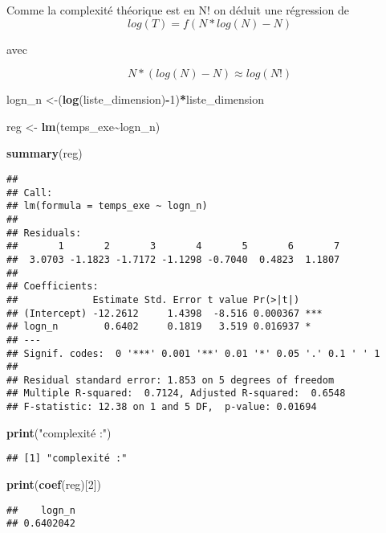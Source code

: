 \documentclass[
  ignorenonframetext,
]{beamer}
\newenvironment{Shaded}{\begin{snugshade}}{\end{snugshade}}
\newcommand{\DecValTok}[1]{\textcolor[rgb]{0.00,0.00,0.81}{#1}}
\newcommand{\FunctionTok}[1]{\textcolor[rgb]{0.13,0.29,0.53}{\textbf{#1}}}
\newcommand{\NormalTok}[1]{#1}
\newcommand{\OtherTok}[1]{\textcolor[rgb]{0.56,0.35,0.01}{#1}}
\newcommand{\SpecialCharTok}[1]{\textcolor[rgb]{0.81,0.36,0.00}{\textbf{#1}}}
\newcommand{\StringTok}[1]{\textcolor[rgb]{0.31,0.60,0.02}{#1}}
\begin{document}
\begin{frame}[fragile]{}
\protect\hypertarget{section-12}{}
Comme la complexité théorique est en N! on déduit une régression de \[
\ log(T)=f(N*log(N)-N)
\]

avec

\[
\ N*(log(N)-N) ≈  log(N!)
\]

\begin{Shaded}
\begin{Highlighting}[]
\NormalTok{logn\_n }\OtherTok{\textless{}{-}}\NormalTok{(}\FunctionTok{log}\NormalTok{(liste\_dimension)}\SpecialCharTok{{-}}\DecValTok{1}\NormalTok{)}\SpecialCharTok{*}\NormalTok{liste\_dimension}

\NormalTok{reg }\OtherTok{\textless{}{-}} \FunctionTok{lm}\NormalTok{(temps\_exe}\SpecialCharTok{\textasciitilde{}}\NormalTok{logn\_n)}

\FunctionTok{summary}\NormalTok{(reg)}
\end{Highlighting}
\end{Shaded}

\begin{verbatim}
## 
## Call:
## lm(formula = temps_exe ~ logn_n)
## 
## Residuals:
##       1       2       3       4       5       6       7 
##  3.0703 -1.1823 -1.7172 -1.1298 -0.7040  0.4823  1.1807 
## 
## Coefficients:
##             Estimate Std. Error t value Pr(>|t|)    
## (Intercept) -12.2612     1.4398  -8.516 0.000367 ***
## logn_n        0.6402     0.1819   3.519 0.016937 *  
## ---
## Signif. codes:  0 '***' 0.001 '**' 0.01 '*' 0.05 '.' 0.1 ' ' 1
## 
## Residual standard error: 1.853 on 5 degrees of freedom
## Multiple R-squared:  0.7124, Adjusted R-squared:  0.6548 
## F-statistic: 12.38 on 1 and 5 DF,  p-value: 0.01694
\end{verbatim}

\begin{Shaded}
\begin{Highlighting}[]
\FunctionTok{print}\NormalTok{(}\StringTok{"complexité :"}\NormalTok{)}
\end{Highlighting}
\end{Shaded}

\begin{verbatim}
## [1] "complexité :"
\end{verbatim}

\begin{Shaded}
\begin{Highlighting}[]
\FunctionTok{print}\NormalTok{(}\FunctionTok{coef}\NormalTok{(reg)[}\DecValTok{2}\NormalTok{])}
\end{Highlighting}
\end{Shaded}

\begin{verbatim}
##    logn_n 
## 0.6402042
\end{verbatim}
\end{frame}
\end{document}
